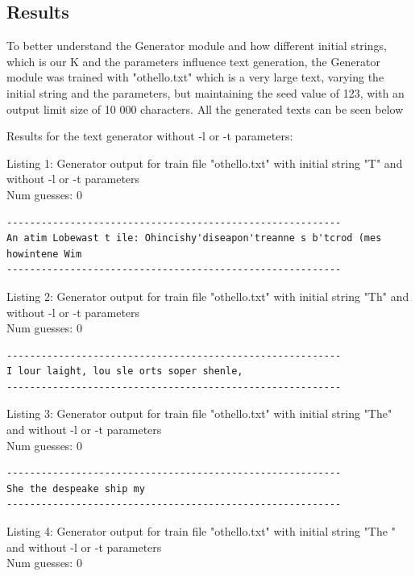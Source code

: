 \documentclass{article}
\begin{document}
\subsection{Results}

To better understand the Generator module and how different initial strings, which is our K and the parameters influence
text generation, the Generator module was trained with "othello.txt" which is a very large text, varying the initial string and the parameters, but
maintaining the seed value of 123, with an output limit size of 10 000 characters.
All the generated texts can be seen below

Results for the text generator without -l or -t parameters:

\hfill

Listing 1: Generator output for train file "othello.txt" with initial string "T" and without -l or -t parameters
\\Num guesses: 0

\begin{lstlisting}
----------------------------------------------------------
An atim Lobewast t ile: Ohincishy'diseapon'treanne s b'tcrod (mes howintene Wim
----------------------------------------------------------
\end{lstlisting}

Listing 2: Generator output for train file "othello.txt" with initial string "Th" and without -l or -t parameters
\\Num guesses: 0

\begin{lstlisting}
----------------------------------------------------------
I lour laight, lou sle orts soper shenle,
----------------------------------------------------------
\end{lstlisting}

Listing 3: Generator output for train file "othello.txt" with initial string "The" and without -l or -t parameters
\\Num guesses: 0

\begin{lstlisting}
----------------------------------------------------------
She the despeake ship my
----------------------------------------------------------
\end{lstlisting}

Listing 4: Generator output for train file "othello.txt" with initial string "The " and without -l or -t parameters
\\Num guesses: 0
\end{document}
